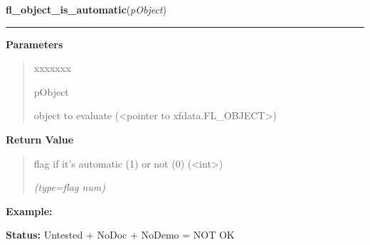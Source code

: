 \hspace{.8\funcindent}\begin{boxedminipage}{\funcwidth}

    \raggedright \textbf{fl\_object\_is\_automatic}(\textit{pObject})

    \vspace{-1.5ex}

    \rule{\textwidth}{0.5\fboxrule}
\setlength{\parskip}{2ex}
\setlength{\parskip}{1ex}
      \textbf{Parameters}
      \vspace{-1ex}

      \begin{quote}
        \begin{Ventry}{xxxxxxx}

          \item[pObject]

          object to evaluate ({\textless}pointer to 
          xfdata.FL\_OBJECT{\textgreater})

        \end{Ventry}

      \end{quote}

      \textbf{Return Value}
    \vspace{-1ex}

      \begin{quote}
      flag if it's automatic (1) or not (0) ({\textless}int{\textgreater})

      {\it (type=flag num)}

      \end{quote}

\textbf{Example:} 

\textbf{Status:} Untested + NoDoc + NoDemo = NOT OK



    \end{boxedminipage}

    \label{xformslib:library:fl_draw_object_label}

    \vspace{0.5ex}

